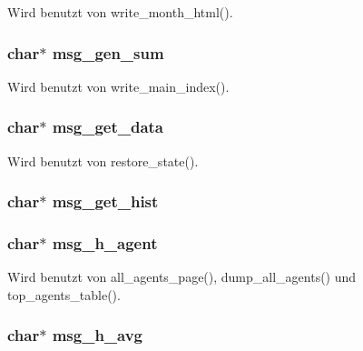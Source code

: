 Wird benutzt von write\_\-month\_\-html().
\subsubsection{\setlength{\rightskip}{0pt plus 5cm}char$\ast$ {\bf msg\_\-gen\_\-sum}}\label{lang_8h_6e6be76001566785c2bcfcbab6dbca41}




Wird benutzt von write\_\-main\_\-index().
\subsubsection{\setlength{\rightskip}{0pt plus 5cm}char$\ast$ {\bf msg\_\-get\_\-data}}\label{lang_8h_2911108863867222d664581ddfa69db0}




Wird benutzt von restore\_\-state().
\subsubsection{\setlength{\rightskip}{0pt plus 5cm}char$\ast$ {\bf msg\_\-get\_\-hist}}\label{lang_8h_13a7e44b057b2a3dfe84864e6e955313}


\subsubsection{\setlength{\rightskip}{0pt plus 5cm}char$\ast$ {\bf msg\_\-h\_\-agent}}\label{lang_8h_88ef492f810cce55301b0422c8c135ec}




Wird benutzt von all\_\-agents\_\-page(), dump\_\-all\_\-agents() und top\_\-agents\_\-table().
\subsubsection{\setlength{\rightskip}{0pt plus 5cm}char$\ast$ {\bf msg\_\-h\_\-avg}}\label{lang_8h_41aae7d7f619d71ff5b47f541d3c8dfd}




